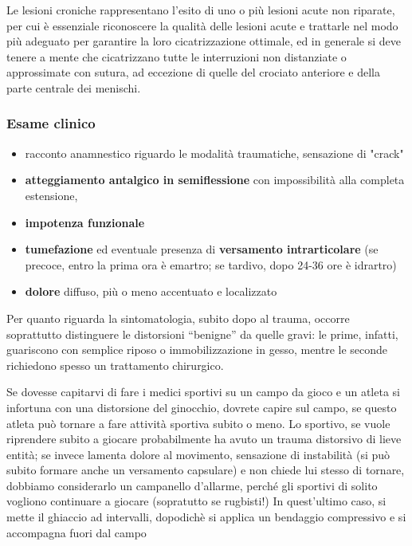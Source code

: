 Le lesioni croniche rappresentano l'esito di uno o più lesioni acute non riparate, per cui è essenziale riconoscere la qualità delle lesioni acute e trattarle nel modo più adeguato per garantire la loro cicatrizzazione ottimale, ed in generale si deve tenere a mente che cicatrizzano tutte le interruzioni non distanziate o approssimate con sutura, ad eccezione di quelle del crociato anteriore e della parte centrale dei menischi.

\subsubsection{Esame clinico}

\begin{itemize}
\item
  racconto anamnestico riguardo le modalità traumatiche, sensazione di "crack"
\item
  \textbf{atteggiamento antalgico in semiflessione} con impossibilità alla completa estensione,
\item
  \textbf{impotenza funzionale}
\item
  \textbf{tumefazione} ed eventuale presenza di \textbf{versamento
  intrarticolare} (se precoce, entro la prima ora è emartro; se tardivo, dopo 24-36 ore è idrartro)
\item
  \textbf{dolore} diffuso, più o meno accentuato e localizzato
\end{itemize}

Per quanto riguarda la sintomatologia, subito dopo al trauma, occorre soprattutto distinguere le distorsioni ``benigne'' da quelle gravi: le prime, infatti, guariscono con semplice riposo o immobilizzazione in gesso, mentre le seconde richiedono spesso un trattamento chirurgico.

Se dovesse capitarvi di fare i medici sportivi su un campo da gioco e un atleta si infortuna con una distorsione del ginocchio, dovrete capire sul campo, se questo atleta può tornare a fare attività sportiva subito o meno. Lo sportivo, se vuole riprendere subito a giocare probabilmente ha avuto un trauma distorsivo di lieve entità; se invece lamenta dolore al movimento, sensazione di instabilità (si può subito formare anche un versamento capsulare) e non chiede lui stesso di tornare, dobbiamo considerarlo un campanello d'allarme, perché gli sportivi di solito vogliono continuare a giocare (sopratutto se rugbisti!)
In quest'ultimo caso, si mette il ghiaccio ad intervalli, dopodichè si applica un bendaggio compressivo e si accompagna fuori dal campo

